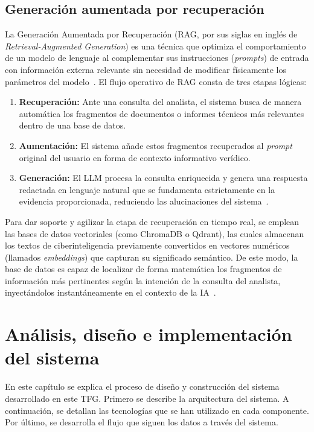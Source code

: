 \documentclass[12pt]{report}
\begin{document}
\section{Generación aumentada por recuperación}
La Generación Aumentada por Recuperación (RAG, por sus siglas en inglés de \textit{Retrieval-Augmented Generation}) es una técnica que optimiza el comportamiento de un modelo de lenguaje al complementar sus instrucciones (\textit{prompts}) de entrada con información externa relevante sin necesidad de modificar físicamente los parámetros del modelo~\cite{lewis2021}. El flujo operativo de RAG consta de tres etapas lógicas:
\begin{enumerate}
    \item \textbf{Recuperación:} Ante una consulta del analista, el sistema busca de manera automática los fragmentos de documentos o informes técnicos más relevantes dentro de una base de datos.
    \item \textbf{Aumentación:} El sistema añade estos fragmentos recuperados al \textit{prompt} original del usuario en forma de contexto informativo verídico.
    \item \textbf{Generación:} El LLM procesa la consulta enriquecida y genera una respuesta redactada en lenguaje natural que se fundamenta estrictamente en la evidencia proporcionada, reduciendo las alucinaciones del sistema~\cite{lewis2021}.
\end{enumerate}

Para dar soporte y agilizar la etapa de recuperación en tiempo real, se emplean las bases de datos vectoriales (como ChromaDB o Qdrant), las cuales almacenan los textos de ciberinteligencia previamente convertidos en vectores numéricos (llamados \textit{embeddings}) que capturan su significado semántico. De este modo, la base de datos es capaz de localizar de forma matemática los fragmentos de información más pertinentes según la intención de la consulta del analista, inyectándolos instantáneamente en el contexto de la IA~\cite{jm3}.

\newpage
\chapter{Análisis, diseño e implementación del sistema}
\label{chap:sistema}
En este capítulo se explica el proceso de diseño y construcción del sistema desarrollado en este TFG. Primero se describe la arquitectura del sistema. A continuación, se detallan las tecnologías que se han utilizado en cada componente. Por último, se desarrolla el flujo que siguen los datos a través del sistema.
\end{document}
